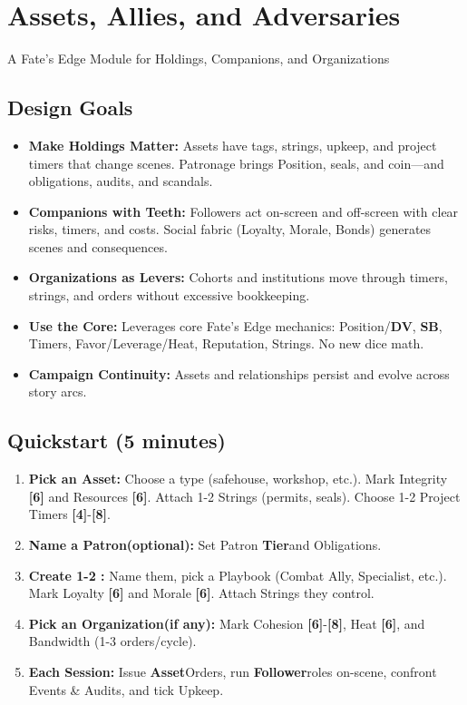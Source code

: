 \documentclass[10pt]{article}
\newcommand{\asset}{\textbf{Asset}}
\newcommand{\follower}{\textbf{Follower}}
\newcommand{\patron}{\textbf{Patron}}
\newcommand{\organisation}{\textbf{Organization}}
\newcommand{\sbtext}{\textbf{SB}}
\newcommand{\dv}{\textbf{DV}}
\newcommand{\timer}[1]{\textbf{[#1]}}
\newcommand{\tier}{\textbf{Tier}}
\begin{document}


\section*{Assets, Allies, and Adversaries}
A Fate's Edge Module for Holdings, Companions, and Organizations

\subsection*{Design Goals}
\begin{itemize}[leftmargin=*,noitemsep]
\item \textbf{Make Holdings Matter:} Assets have tags, strings, upkeep, and project timers that change scenes. Patronage brings Position, seals, and coin---and obligations, audits, and scandals.
\item \textbf{Companions with Teeth:} Followers act on-screen and off-screen with clear risks, timers, and costs. Social fabric (Loyalty, Morale, Bonds) generates scenes and consequences.
\item \textbf{Organizations as Levers:} Cohorts and institutions move through timers, strings, and orders without excessive bookkeeping.
\item \textbf{Use the Core:} Leverages core Fate's Edge mechanics: Position/\dv, \sbtext, Timers, Favor/Leverage/Heat, Reputation, Strings. No new dice math.
\item \textbf{Campaign Continuity:} Assets and relationships persist and evolve across story arcs.
\end{itemize}

\subsection*{Quickstart (5 minutes)}
\begin{enumerate}[leftmargin=*,noitemsep]
\item \textbf{Pick an \asset:} Choose a type (safehouse, workshop, etc.). Mark Integrity \timer{6} and Resources \timer{6}. Attach 1-2 Strings (permits, seals). Choose 1-2 Project Timers \timer{4}-\timer{8}.
\item \textbf{Name a \patron (optional):} Set Patron \tier and Obligations.
\item \textbf{Create 1-2 \followers:} Name them, pick a Playbook (Combat Ally, Specialist, etc.). Mark Loyalty \timer{6} and Morale \timer{6}. Attach Strings they control.
\item \textbf{Pick an \organisation (if any):} Mark Cohesion \timer{6}-\timer{8}, Heat \timer{6}, and Bandwidth (1-3 orders/cycle).
\item \textbf{Each Session:} Issue \asset Orders, run \follower roles on-scene, confront Events \& Audits, and tick Upkeep.
\end{enumerate}
\end{document}
